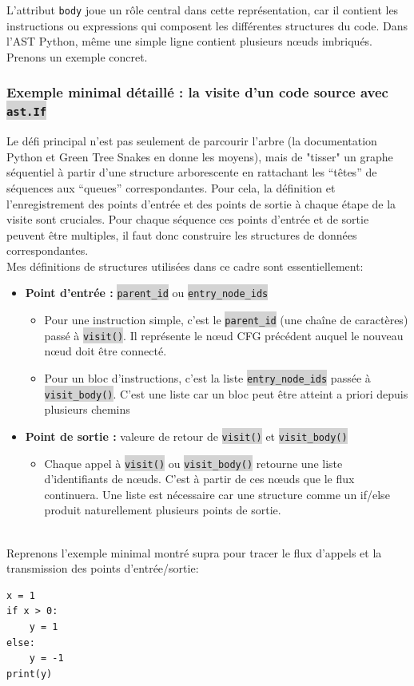\documentclass[11pt,a4paper]{article}
\newcommand{\code}[1]{\colorbox{lightgray}{\texttt{\small #1}}}
\begin{document}
L'attribut \texttt{body} joue un rôle central dans cette représentation, car il contient les instructions ou expressions qui composent les différentes structures du code. 
Dans l'AST Python, même une simple ligne contient plusieurs nœuds imbriqués. Prenons un exemple concret.

\subsubsection{Exemple minimal détaillé : la visite d'un code source avec \code{ast.If}}
Le défi principal n'est pas seulement de parcourir l'arbre (la documentation Python et Green Tree Snakes en donne les moyens), mais de "tisser" un graphe séquentiel à partir d'une structure arborescente en rattachant les ``têtes'' de séquences aux ``queues'' correspondantes.
Pour cela, la définition et l'enregistrement des points d'entrée et des points de sortie à chaque étape de la visite sont cruciales.
Pour chaque séquence ces points d'entrée et de sortie peuvent être multiples, il faut donc construire les structures de données correspondantes.\\
Mes définitions de structures utilisées dans ce cadre sont essentiellement:
\begin{itemize}
    \item \textbf{Point d'entrée :} \code{parent\_id} ou \code{entry\_node\_ids}
    \begin{itemize}
        \item Pour une instruction simple, c'est le \code{parent\_id} (une chaîne de caractères) passé à \code{visit()}. Il représente le nœud CFG précédent auquel le nouveau nœud doit être connecté.
        \item Pour un bloc d'instructions, c'est la liste \code{entry\_node\_ids} passée à \code{visit_body()}. C'est une liste car un bloc peut être atteint a priori depuis plusieurs chemins 
    \end{itemize}
    \item \textbf{Point de sortie :} valeure de retour de \code{visit()} et \code{visit\_body()}
    \begin{itemize}
        \item Chaque appel à \code{visit()} ou \code{visit\_body()} retourne une liste d'identifiants de nœuds. C'est à partir de ces nœuds que le flux continuera. Une liste est nécessaire car une structure comme un if/else produit naturellement plusieurs points de sortie. 
    \end{itemize}
\end{itemize}
\\Reprenons l'exemple minimal montré supra pour tracer le flux d'appels et la transmission des points d'entrée/sortie:
\begin{verbatim}
x = 1
if x > 0:
    y = 1
else:
    y = -1
print(y)
\end{verbatim}
\end{document}
